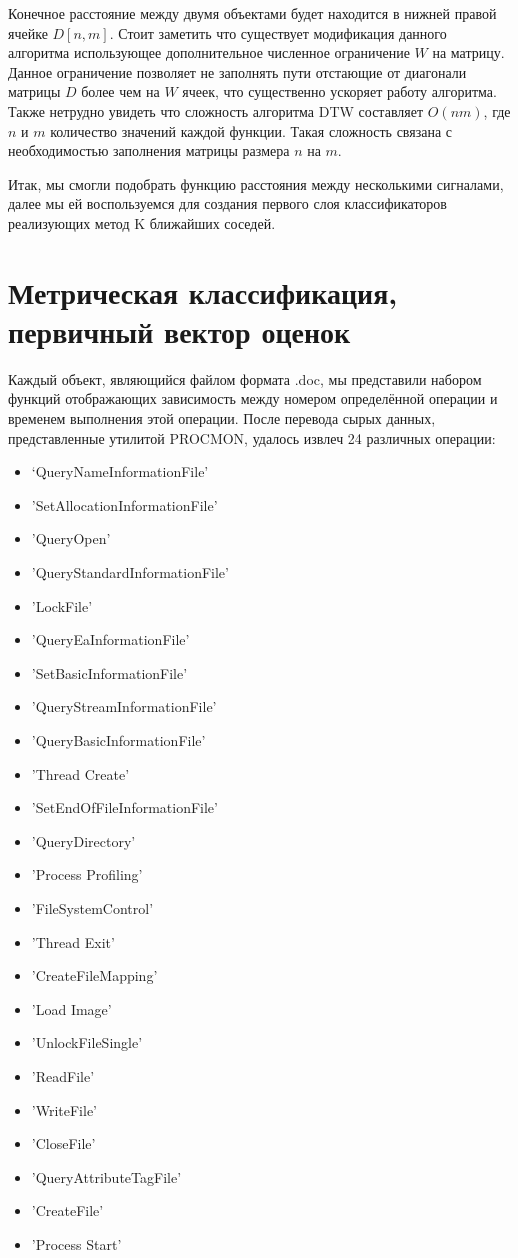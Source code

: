 Конечное расстояние между двумя объектами будет находится в  нижней правой ячейке $D[n, m]$. Стоит заметить что существует модификация данного алгоритма использующее дополнительное численное ограничение $W$ на матрицу. Данное ограничение позволяет не заполнять пути отстающие от диагонали матрицы $D$ более чем на $W$ ячеек, что существенно ускоряет работу алгоритма. Также нетрудно увидеть что сложность алгоритма DTW составляет $O(n m)$, где $n$ и $m$ количество значений каждой функции. Такая сложность связана с необходимостью заполнения матрицы размера $n$ на $m$. 

Итак, мы смогли подобрать функцию расстояния между несколькими сигналами, далее мы ей воспользуемся для создания первого слоя классификаторов реализующих метод K ближайших соседей.

\section{Метрическая классификация, первичный вектор оценок}

Каждый объект, являющийся файлом формата .doc, мы представили набором функций отображающих зависимость между номером определённой операции и временем выполнения этой операции. После перевода сырых данных, представленные утилитой PROCMON, удалось извлеч 24 различных операции: 

\begin{itemize}
\item ‘QueryNameInformationFile'
\item 'SetAllocationInformationFile'
\item 'QueryOpen'
\item 'QueryStandardInformationFile'
\item 'LockFile'
\item 'QueryEaInformationFile'
\item 'SetBasicInformationFile'
\item 'QueryStreamInformationFile'
\item 'QueryBasicInformationFile'
\item 'Thread Create'
\item 'SetEndOfFileInformationFile'
\item 'QueryDirectory'
\item 'Process Profiling'
\item 'FileSystemControl'
\item 'Thread Exit'
\item 'CreateFileMapping'
\item 'Load Image'
\item 'UnlockFileSingle'
\item 'ReadFile'
\item 'WriteFile'
\item 'CloseFile'
\item 'QueryAttributeTagFile'
\item 'CreateFile'
\item 'Process Start’ 
\end{itemize}

